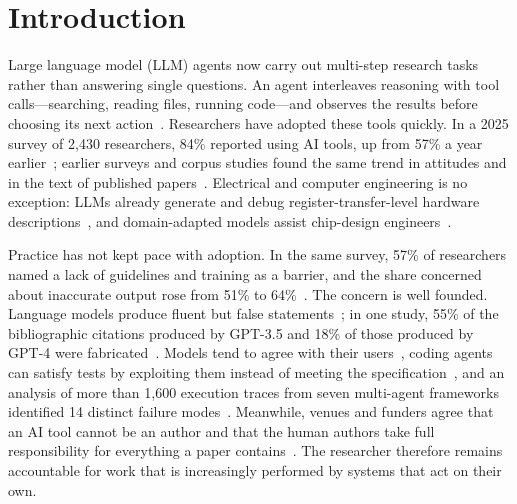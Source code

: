 \section{Introduction}
\label{sec:intro}

Large language model (LLM) agents now carry out multi-step research tasks rather than
answering single questions. An agent interleaves reasoning with tool calls---searching,
reading files, running code---and observes the results before choosing its next
action~\cite{yao2023react,wang2024survey,xi2025rise}. Researchers have adopted these tools
quickly. In a 2025 survey of 2,430 researchers, 84\% reported using AI tools, up from
57\% a year earlier~\cite{wiley2025explanaitions}; earlier surveys and corpus studies
found the same trend in attitudes and in the text of published
papers~\cite{vannoorden2023ai,liang2024mapping}. Electrical and computer engineering is
no exception: LLMs already generate and debug register-transfer-level hardware
descriptions~\cite{thakur2023benchmarking,blocklove2023chipchat,liu2023verilogeval}, and
domain-adapted models assist chip-design engineers~\cite{liu2023chipnemo}.

Practice has not kept pace with adoption. In the same survey, 57\% of researchers named a
lack of guidelines and training as a barrier, and the share concerned about inaccurate
output rose from 51\% to 64\%~\cite{wiley2025explanaitions}. The concern is well
founded. Language models produce fluent but false statements~\cite{ji2023survey};
in one study, 55\% of the bibliographic citations produced by GPT-3.5 and 18\% of those
produced by GPT-4 were fabricated~\cite{walters2023fabrication}. Models tend to agree with
their users~\cite{sharma2023sycophancy}, coding agents can satisfy tests by exploiting
them instead of meeting the specification~\cite{zhong2025impossiblebench}, and an
analysis of more than 1,600 execution traces from seven multi-agent frameworks
identified 14 distinct failure modes~\cite{cemri2025multiagent}. Meanwhile, venues and
funders agree that an AI tool cannot be an author and that the human authors take full
responsibility for everything a paper
contains~\cite{arxiv2025genai,thorp2023chatgpt,nature2023tools,ec2025living}. The
researcher therefore remains accountable for work that is increasingly performed by
systems that act on their own.

